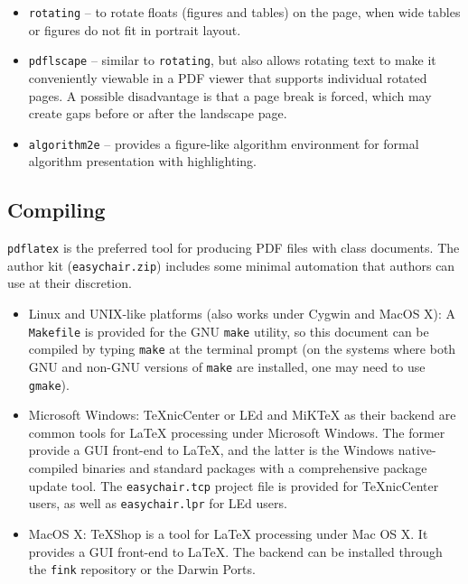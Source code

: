 \documentclass{easychair}
\newcommand{\easychair}{\sf{easychair}}
\newcommand{\miktex}{MiK{\TeX}}
\newcommand{\texniccenter}{{\TeX}nicCenter}
\newcommand{\makefile}{\texttt{Makefile}}
\newcommand{\latexeditor}{LEd}
\begin{document}
\begin{itemize}
\item
\texttt{rotating} \cite{rotating-package} -- to rotate floats (figures and
tables) on the page, when wide tables or figures do not fit in portrait layout.

\item
\texttt{pdflscape} \cite{pdflscape-package} -- similar to \texttt{rotating}, 
but also allows rotating text to make it conveniently viewable in a PDF 
viewer that supports individual rotated pages.
A possible disadvantage is that a page break is forced, which may create
gaps before or after the landscape page.

\item
\texttt{algorithm2e} \cite{algorithm2e-package} -- provides a figure-like
algorithm environment for formal algorithm presentation with highlighting.

\end{itemize}

\subsection{Compiling}
\label{sect:compiling}

\texttt{pdflatex} \cite{pdflatex-instructions} is the preferred tool for
producing PDF files with {\easychair} class documents.
The author kit (\texttt{easychair.zip}) includes some minimal automation 
that authors can use at their discretion.

\begin{itemize}
\item
Linux and UNIX-like platforms (also works under Cygwin and MacOS X):
A {\makefile} is provided for the GNU \texttt{make} \cite{gmake} utility,
so this document can be compiled by typing \texttt{make} at the terminal 
prompt (on the systems where both GNU and non-GNU versions of \texttt{make} 
are installed, one may need to use \texttt{gmake}).

\item
Microsoft Windows:
{\texniccenter} \cite{texniccenter} or {\latexeditor} \cite{led} and
{\miktex} \cite{miktex} as their backend are common tools
for {\LaTeX} processing under Microsoft Windows. 
The former provide a GUI front-end to {\LaTeX}, and the latter is the 
Windows native-compiled binaries and standard packages with 
a comprehensive package update tool. 
The \texttt{easychair.tcp} project file is provided for {\texniccenter} users,
as well as \texttt{easychair.lpr} for {\latexeditor} users.

\item
MacOS X:
TeXShop \cite{texshop} is a tool for {\LaTeX} processing under Mac OS X.
It provides a GUI front-end to {\LaTeX}. The backend can be installed
through the \texttt{fink} \cite{fink} repository or the Darwin Ports.

\end{itemize}
\end{document}
